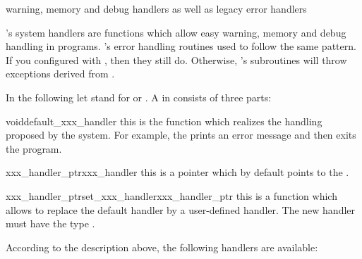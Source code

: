 


\NAME

 \dotfill warning, memory and debug handlers as well as
legacy error handlers



\ABSTRACT

\LiDIA's system handlers are functions which allow easy warning, memory and debug
handling in \LiDIA programs. \LiDIA's error handling routines used to follow
the same pattern. If you configured \LiDIA with
, then they still do. Otherwise, \LiDIA's
subroutines will throw exceptions derived from .



\DESCRIPTION

In the following let  stand for  or
.  A  in \LiDIA consists of three parts:

\begin{fcode}{void}{default_xxx_handler}{}
  this is the function which realizes the handling proposed by the \LiDIA system.  For example,
  the  prints an error message and then exits the program.
\end{fcode}

\begin{fcode}{{xxx_handler_ptr}}{xxx_handler}{}
  this is a pointer which by default points to the .
\end{fcode}

\begin{fcode}{{xxx_handler_ptr}}{set_xxx_handler}{xxx_handler_ptr}
  this is a function which allows to replace the default handler by a user-defined handler.  The
  new handler must have the type .
\end{fcode}

According to the description above, the following handlers are available:

